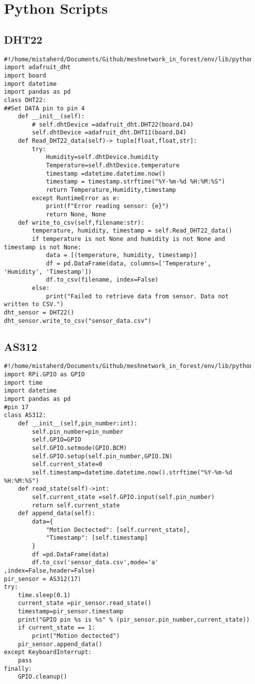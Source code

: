 \section{Python Scripts}
\subsection{DHT22}
\begin{lstlisting}[style=mystyle,caption={DHT22code}]
#!/home/mistaherd/Documents/Github/meshnetwork_in_forest/env/lib/python3.11
import adafruit_dht 
import board
import datetime
import pandas as pd
class DHT22:
##Set DATA pin to pin 4
    def __init__(self):
        # self.dhtDevice =adafruit_dht.DHT22(board.D4)
        self.dhtDevice =adafruit_dht.DHT11(board.D4)
    def Read_DHT22_data(self)-> tuple[float,float,str]:
        try:
            Humidity=self.dhtDevice.humidity
            Temperature=self.dhtDevice.temperature
            timestamp =datetime.datetime.now()
            timestamp = timestamp.strftime("%Y-%m-%d %H:%M:%S")
            return Temperature,Humidity,timestamp
        except RuntimeError as e:
            print(f"Error reading sensor: {e}")
            return None, None
    def write_to_csv(self,filename:str):
        temperature, humidity, timestamp = self.Read_DHT22_data()
        if temperature is not None and humidity is not None and timestamp is not None:
            data = [(temperature, humidity, timestamp)]
            df = pd.DataFrame(data, columns=['Temperature', 'Humidity', 'Timestamp'])
            df.to_csv(filename, index=False)
        else:
            print("Failed to retrieve data from sensor. Data not written to CSV.")
dht_sensor = DHT22()
dht_sensor.write_to_csv("sensor_data.csv")
\end{lstlisting}
\newpage
\subsection{AS312}
\begin{lstlisting}[style=mystyle,caption={code for  AS312}]
#!/home/mistaherd/Documents/Github/meshnetwork_in_forest/env/lib/python3.11
import RPi.GPIO as GPIO
import time
import datetime
import pandas as pd
#pin 17
class AS312:
	def __init__(self,pin_number:int):
		self.pin_number=pin_number
		self.GPIO=GPIO
		self.GPIO.setmode(GPIO.BCM)
		self.GPIO.setup(self.pin_number,GPIO.IN)
		self.current_state=0
		self.timestamp=datetime.datetime.now().strftime("%Y-%m-%d %H:%M:%S")
	def read_state(self)->int:
		self.current_state =self.GPIO.input(self.pin_number)
		return self.current_state
	def append_data(self):
		data={
			"Motion Dectected": [self.current_state],
			"Timestamp": [self.timestamp]
		}
		df =pd.DataFrame(data)
		df.to_csv('sensor_data.csv',mode='a' ,index=False,header=False)
pir_sensor = AS312(17)
try:
	time.sleep(0.1)
	current_state =pir_sensor.read_state()
	timestamp=pir_sensor.timestamp
	print("GPIO pin %s is %s" % (pir_sensor.pin_number,current_state))
	if current_state == 1:
		print("Motion dectected")
	pir_sensor.append_data()
except KeyboardInterrupt:
	pass
finally:
	GPIO.cleanup()
\end{lstlisting}


